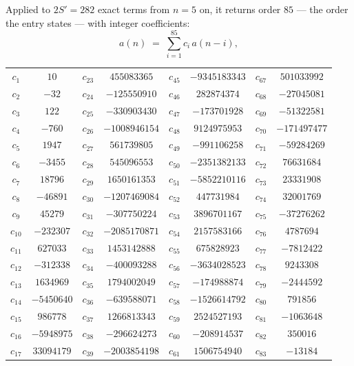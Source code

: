 \documentclass[11pt,a4paper]{article}
\theoremstyle{plain}
\theoremstyle{definition}
\begin{document}
Applied to $2S'=282$ exact terms from $n=5$ on, it returns order $85$ --- the
order the entry states --- with integer coefficients:
\[
a(n)\;=\;\sum_{i=1}^{85}c_i\,a(n-i),
\]
\begin{center}\small
\begin{tabular}{cccccccc}
$c_{1}$ & $10$ & $c_{23}$ & $455083365$ & $c_{45}$ & $-9345183343$ & $c_{67}$ & $501033992$ \\
$c_{2}$ & $-32$ & $c_{24}$ & $-125550910$ & $c_{46}$ & $282874374$ & $c_{68}$ & $-27045081$ \\
$c_{3}$ & $122$ & $c_{25}$ & $-330903430$ & $c_{47}$ & $-173701928$ & $c_{69}$ & $-51322581$ \\
$c_{4}$ & $-760$ & $c_{26}$ & $-1008946154$ & $c_{48}$ & $9124975953$ & $c_{70}$ & $-171497477$ \\
$c_{5}$ & $1947$ & $c_{27}$ & $561739805$ & $c_{49}$ & $-991106258$ & $c_{71}$ & $-59284269$ \\
$c_{6}$ & $-3455$ & $c_{28}$ & $545096553$ & $c_{50}$ & $-2351382133$ & $c_{72}$ & $76631684$ \\
$c_{7}$ & $18796$ & $c_{29}$ & $1650161353$ & $c_{51}$ & $-5852210116$ & $c_{73}$ & $23331908$ \\
$c_{8}$ & $-46891$ & $c_{30}$ & $-1207469084$ & $c_{52}$ & $447731984$ & $c_{74}$ & $32001769$ \\
$c_{9}$ & $45279$ & $c_{31}$ & $-307750224$ & $c_{53}$ & $3896701167$ & $c_{75}$ & $-37276262$ \\
$c_{10}$ & $-232307$ & $c_{32}$ & $-2085170871$ & $c_{54}$ & $2157583166$ & $c_{76}$ & $4787694$ \\
$c_{11}$ & $627033$ & $c_{33}$ & $1453142888$ & $c_{55}$ & $675828923$ & $c_{77}$ & $-7812422$ \\
$c_{12}$ & $-312338$ & $c_{34}$ & $-400093288$ & $c_{56}$ & $-3634028523$ & $c_{78}$ & $9243308$ \\
$c_{13}$ & $1634969$ & $c_{35}$ & $1794002049$ & $c_{57}$ & $-174988874$ & $c_{79}$ & $-2444592$ \\
$c_{14}$ & $-5450640$ & $c_{36}$ & $-639588071$ & $c_{58}$ & $-1526614792$ & $c_{80}$ & $791856$ \\
$c_{15}$ & $986778$ & $c_{37}$ & $1266813343$ & $c_{59}$ & $2524527193$ & $c_{81}$ & $-1063648$ \\
$c_{16}$ & $-5948975$ & $c_{38}$ & $-296624273$ & $c_{60}$ & $-208914537$ & $c_{82}$ & $350016$ \\
$c_{17}$ & $33094179$ & $c_{39}$ & $-2003854198$ & $c_{61}$ & $1506754940$ & $c_{83}$ & $-13184$ \\

\end{tabular}
\end{center}
\end{document}
